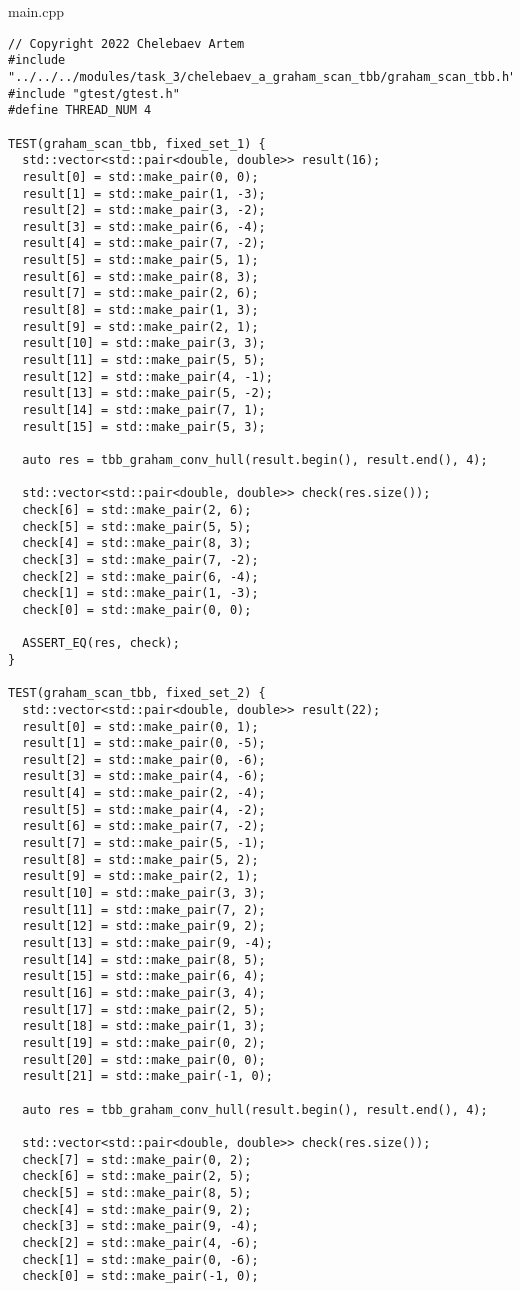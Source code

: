 \documentclass{report}
\begin{document}
main.cpp
\begin{lstlisting}
// Copyright 2022 Chelebaev Artem
#include "../../../modules/task_3/chelebaev_a_graham_scan_tbb/graham_scan_tbb.h"
#include "gtest/gtest.h"
#define THREAD_NUM 4

TEST(graham_scan_tbb, fixed_set_1) {
  std::vector<std::pair<double, double>> result(16);
  result[0] = std::make_pair(0, 0);
  result[1] = std::make_pair(1, -3);
  result[2] = std::make_pair(3, -2);
  result[3] = std::make_pair(6, -4);
  result[4] = std::make_pair(7, -2);
  result[5] = std::make_pair(5, 1);
  result[6] = std::make_pair(8, 3);
  result[7] = std::make_pair(2, 6);
  result[8] = std::make_pair(1, 3);
  result[9] = std::make_pair(2, 1);
  result[10] = std::make_pair(3, 3);
  result[11] = std::make_pair(5, 5);
  result[12] = std::make_pair(4, -1);
  result[13] = std::make_pair(5, -2);
  result[14] = std::make_pair(7, 1);
  result[15] = std::make_pair(5, 3);

  auto res = tbb_graham_conv_hull(result.begin(), result.end(), 4);

  std::vector<std::pair<double, double>> check(res.size());
  check[6] = std::make_pair(2, 6);
  check[5] = std::make_pair(5, 5);
  check[4] = std::make_pair(8, 3);
  check[3] = std::make_pair(7, -2);
  check[2] = std::make_pair(6, -4);
  check[1] = std::make_pair(1, -3);
  check[0] = std::make_pair(0, 0);

  ASSERT_EQ(res, check);
}

TEST(graham_scan_tbb, fixed_set_2) {
  std::vector<std::pair<double, double>> result(22);
  result[0] = std::make_pair(0, 1);
  result[1] = std::make_pair(0, -5);
  result[2] = std::make_pair(0, -6);
  result[3] = std::make_pair(4, -6);
  result[4] = std::make_pair(2, -4);
  result[5] = std::make_pair(4, -2);
  result[6] = std::make_pair(7, -2);
  result[7] = std::make_pair(5, -1);
  result[8] = std::make_pair(5, 2);
  result[9] = std::make_pair(2, 1);
  result[10] = std::make_pair(3, 3);
  result[11] = std::make_pair(7, 2);
  result[12] = std::make_pair(9, 2);
  result[13] = std::make_pair(9, -4);
  result[14] = std::make_pair(8, 5);
  result[15] = std::make_pair(6, 4);
  result[16] = std::make_pair(3, 4);
  result[17] = std::make_pair(2, 5);
  result[18] = std::make_pair(1, 3);
  result[19] = std::make_pair(0, 2);
  result[20] = std::make_pair(0, 0);
  result[21] = std::make_pair(-1, 0);

  auto res = tbb_graham_conv_hull(result.begin(), result.end(), 4);

  std::vector<std::pair<double, double>> check(res.size());
  check[7] = std::make_pair(0, 2);
  check[6] = std::make_pair(2, 5);
  check[5] = std::make_pair(8, 5);
  check[4] = std::make_pair(9, 2);
  check[3] = std::make_pair(9, -4);
  check[2] = std::make_pair(4, -6);
  check[1] = std::make_pair(0, -6);
  check[0] = std::make_pair(-1, 0);


\end{lstlisting}
\end{document}
